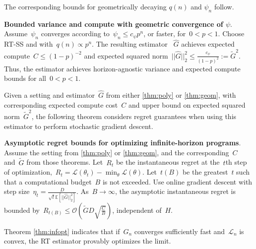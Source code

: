 The corresponding bounds for geometrically decaying $q(n)$ and $\psi_n$ follow.

\begin{theorem}\label{thm:geom}
\textbf{Bounded variance and compute with geometric convergence of $\psi$}.
Assume~$\psi_n$ converges according to~${\psi_n \leq c_\psi p^n}$, or faster, for~${0 < p < 1}$.
Choose RT-SS and with~${q(n) \propto p^n}$.
The resulting estimator ~$\hat{G}$ achieves expected compute~${C \leq (1-p)^{-2}}$ and expected squared norm~${||\hat{G}||_2^2 \leq \frac{c_\psi}{(1-p)^2} := \tilde{G}^2}$.
Thus, the estimator achieves horizon-agnostic variance and expected compute bounds for all~${0 < p < 1}$.
\end{theorem}
Given a setting and estimator~$\hat{G}$ from either \ref{thm:poly} or \ref{thm:geom}, with corresponding expected compute cost~$C$ and upper bound on expected squared norm~$\tilde{G}^2$, the following theorem considers regret guarantees when using this estimator to perform stochastic gradient descent.

\begin{theorem}\label{thm:infopt}
\textbf{Asymptotic regret bounds for optimizing infinite-horizon programs}.
Assume the setting from \ref{thm:poly} or \ref{thm:geom}, and the corresponding~$C$ and~$\tilde{G}$ from those theorems.
Let~$R_t$ be the instantaneous regret at the~$t$th step of optimization,~${R_t = \mathcal{L}(\theta_t) - \min_\theta \mathcal{L} (\theta)}$.
Let~$t(B)$ be the greatest~$t$ such that a computational budget~$B$ is not exceeded.
Use online gradient descent with step size~${\eta_t = \frac{D}{\sqrt{t} \mathbb{E}[||\hat{G}||_2^2]}}$.
As~${B \to \infty}$, the asymptotic instantaneous regret is bounded by~${R_{t(B)} \leq \mathcal{O} (\tilde{G} D \sqrt{\frac{C}{B}})}$, independent of~$H$.
\end{theorem}

Theorem \ref{thm:infopt} indicates that if~$G_n$ converges sufficiently fast and~$\mathcal{L}_n$ is convex, the RT estimator provably optimizes the limit.
